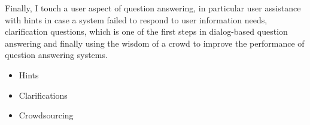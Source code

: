 Finally, I touch a user aspect of question answering, in particular user assistance with hints in case a system failed to respond to user information needs, clarification questions, which is one of the first steps in dialog-based question answering and finally using the wisdom of a crowd to improve the performance of question answering systems.
\begin{itemize}
\item Hints 
\item Clarifications
\item Crowdsourcing
\end{itemize}

